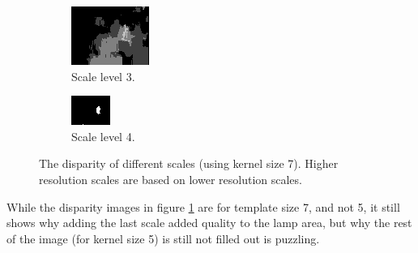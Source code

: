 \documentclass[12pt,a4paper,oneside,final]{article}
\begin{document}
{\begin{figure}[H]
\begin{subfigure}[b]{0.24\textwidth}
	\includegraphics[width=\textwidth]{disparity3.png}
	\caption{Scale level 3.}
\end{subfigure}
\begin{subfigure}[b]{0.24\textwidth}
	\includegraphics[width=\textwidth]{disparity4.png}
	\caption{Scale level 4.}
\end{subfigure}
\caption{The disparity of different scales (using kernel size 7). Higher resolution scales are based on lower resolution scales.}
\label{fig:lowlevel}
\end{figure}
While the disparity images in figure \ref{fig:lowlevel} are for template size 7, and not 5, it still shows why adding the last scale added quality to the lamp area, but why the rest of the image (for kernel size 5) is still not filled out is puzzling.}
\end{document}
